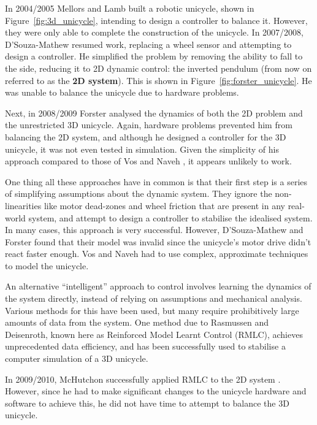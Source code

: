 \documentclass{IIBproject}
\begin{document}
In 2004/2005 Mellors and Lamb \cite{ref:mellors,ref:lamb} built a robotic
unicycle, shown in Figure~\ref{fig:3d_unicycle}, intending to design a controller to balance it. However, they were
only able to complete the construction of the unicycle. In 2007/2008,
D'Souza-Mathew resumed work, replacing a wheel sensor and attempting to design
a controller. He simplified the problem by removing the ability to fall to the
side, reducing it to 2D dynamic control: the inverted pendulum (from
now on referred to as the \textbf{2D system}). This is shown in
Figure~\ref{fig:forster_unicycle}. He was unable to balance the unicycle due to
hardware problems.

Next, in 2008/2009 Forster analysed the dynamics of both the 2D problem and
the unrestricted 3D unicycle\cite{ref:forster}. Again, hardware problems
prevented him from balancing the 2D system, and although he designed a
controller for the 3D unicycle, it was not even tested in simulation. Given
the simplicity of his approach compared to those of Vos and Naveh
\cite{ref:vos,ref:naveh}, it appears unlikely to work.

One thing all these approaches have in common is that their first step is a
series of simplifying assumptions about the dynamic system. They ignore the
non-linearities like motor dead-zones and wheel friction that are present in
any real-world system, and attempt to design a controller to stabilise the
idealised system. In many cases, this approach is very successful. However,
D'Souza-Mathew and Forster found that their model was invalid since the
unicycle's motor drive didn't react faster enough. Vos and Naveh had to use
complex, approximate techniques to model the unicycle.

An alternative ``intelligent'' approach to control involves learning the
dynamics of the system directly, instead of relying on assumptions and
mechanical analysis. Various methods for this have been used, but many require
prohibitively large amounts of data from the system. One method due to
Rasmussen and Deisenroth, known here as Reinforced Model Learnt Control
(RMLC), achieves unprecedented data efficiency, and has been successfully used
to stabilise a computer simulation of a 3D
unicycle\cite{ref:rasdei08,ref:rasdei11}.

In 2009/2010, McHutchon successfully applied RMLC to the 2D system
\cite{ref:mchutchon}. However, since he had to make significant changes to the
unicycle hardware and software to achieve this, he did not have time to
attempt to balance the 3D unicycle.
\end{document}

